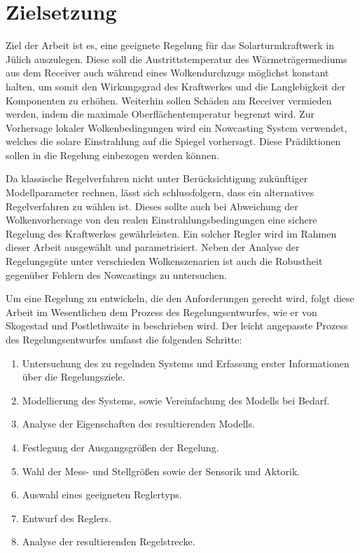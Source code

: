 \section{Zielsetzung} \label{sec_Zielsetzung}
Ziel der Arbeit ist es, eine geeignete Regelung für das Solarturmkraftwerk in Jülich auszulegen.
Diese soll die Austrittstemperatur des Wärmeträgermediums aus dem Receiver auch während eines Wolkendurchzugs möglichst konstant halten, um somit den Wirkungsgrad des Kraftwerkes und die Langlebigkeit der Komponenten zu erhöhen.
Weiterhin sollen Schäden am Receiver vermieden werden, indem die maximale Oberflächentemperatur begrenzt wird.
Zur Vorhersage lokaler Wolkenbedingungen wird ein Nowcasting System verwendet, welches die solare Einstrahlung auf die Spiegel vorhersagt.
Diese Prädiktionen sollen in die Regelung einbezogen werden können.

Da klassische Regelverfahren nicht unter Berücksichtigung zukünftiger Modellparameter rechnen, lässt sich schlussfolgern, dass ein alternatives Regelverfahren zu wählen ist.
Dieses sollte auch bei Abweichung der Wolkenvorhersage von den realen Einstrahlungsbedingungen eine sichere Regelung des Kraftwerkes gewährleisten.
Ein solcher Regler wird im Rahmen dieser Arbeit ausgewählt und parametrisiert.
Neben der Analyse der Regelungsgüte unter verschieden Wolkenszenarien ist auch die Robustheit gegenüber Fehlern des Nowcastings zu untersuchen.

Um eine Regelung zu entwickeln, die den Anforderungen gerecht wird, folgt diese Arbeit im Wesentlichen dem Prozess des Regelungsentwurfes, wie er von Skogestad und Postlethwaite in \cite[S.1]{Skogestad} beschrieben wird.
Der leicht angepasste Prozess des Regelungsentwurfes umfasst die folgenden Schritte:
\begin{enumerate}
    \item Untersuchung des zu regelnden Systems und Erfassung erster Informationen über die Regelungsziele.
    \item Modellierung des Systems, sowie Vereinfachung des Modells bei Bedarf.
    \item Analyse der Eigenschaften des resultierenden Modells.
    \item Festlegung der Ausgangsgrößen der Regelung.
    \item Wahl der Mess- und Stellgrößen sowie der Sensorik und Aktorik.
    \item Auswahl eines geeigneten Reglertyps.
    \item Entwurf des Reglers.
    \item Analyse der resultierenden Regelstrecke.
\end{enumerate}


